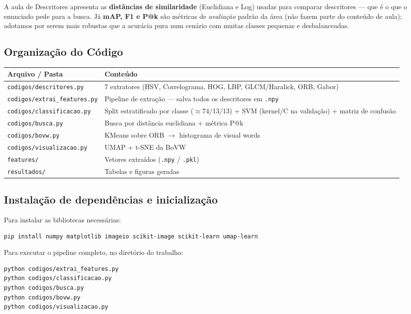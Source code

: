 \documentclass[12pt, a4paper]{article}
\begin{document}
A aula de Descritores apresenta as \textbf{distâncias de similaridade} (Euclidiana e Log) usadas para comparar descritores --- que é o que o enunciado pede para a busca. Já \textbf{mAP, F1 e P@k} são métricas de \textit{avaliação} padrão da área (não fazem parte do conteúdo de aula); adotamos por serem mais robustas que a acurácia pura num cenário com muitas classes pequenas e desbalanceadas.

\subsection*{Organização do Código}
\begin{table}[H]
\centering
\begin{tabularx}{\textwidth}{l X}
\toprule
\textbf{Arquivo / Pasta} & \textbf{Conteúdo} \\
\midrule
\texttt{codigos/descritores.py} & 7 extratores (HSV, Correlograma, HOG, LBP, GLCM/Haralick, ORB, Gabor) \\
\texttt{codigos/extrai\_features.py} & Pipeline de extração — salva todos os descritores em \texttt{.npy} \\
\texttt{codigos/classificacao.py} & Split estratificado por classe ($\approx$74/13/13) + SVM (kernel/C na validação) + matriz de confusão \\
\texttt{codigos/busca.py} & Busca por distância euclidiana + métrica P@k \\
\texttt{codigos/bovw.py} & KMeans sobre ORB $\to$ histograma de visual words \\
\texttt{codigos/visualizacao.py} & UMAP + t-SNE da BoVW \\
\texttt{features/} & Vetores extraídos (\texttt{.npy} / \texttt{.pkl}) \\
\texttt{resultados/} & Tabelas e figuras geradas \\
\bottomrule
\end{tabularx}
\end{table}

\subsection*{Instalação de dependências e inicialização}
Para instalar as bibliotecas necessárias:
\begin{lstlisting}[language=bash]
pip install numpy matplotlib imageio scikit-image scikit-learn umap-learn
\end{lstlisting}

Para executar o pipeline completo, no diretório do trabalho:
\begin{lstlisting}[language=bash]
python codigos/extrai_features.py
python codigos/classificacao.py
python codigos/busca.py
python codigos/bovw.py
python codigos/visualizacao.py
\end{lstlisting}
\end{document}
